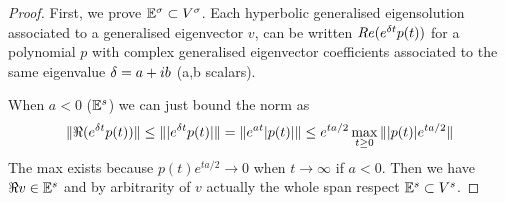 \begin{definition}
\begin{proof}

First, we prove $\mathbb{E}^\sigma\subset V^\sigma$. Each hyperbolic generalised eigensolution associated to a generalised eigenvector $v$, can be written $Re(e^{\delta t}p(t))$ for a  polynomial $p$ with complex generalised eigenvector coefficients associated to the same eigenvalue $\delta=a+ib$ (a,b scalars).

When $a<0$ ($\mathbb{E}^s$) we can just bound the norm as 
$$\|\Re(e^{\delta t}p(t))\| \leq  \| |e^{\delta t}p(t)|\|=\|e^{at} |p(t)|\| \leq e^{ta/2} \max_{t\geq0}\||p(t)|e^{ta/2}\| $$
The max exists because $p(t)e^{ta/2}\to 0$ when $t\to\infty$ if $a<0$. Then we have $\Re v \in \mathbb{E}^s$ and by arbitrarity of $v$ actually the whole span respect $\mathbb{E}^s\subset V^s$.


\end{proof}
\end{definition}
